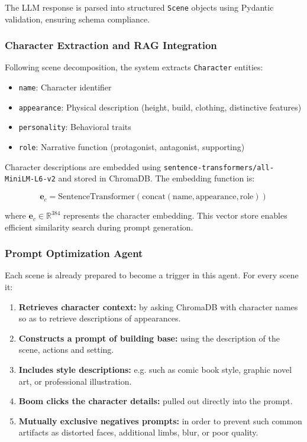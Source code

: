\documentclass[runningheads]{llncs}
\begin{document}
The LLM response is parsed into structured \texttt{Scene} objects using Pydantic validation, ensuring schema compliance.

\subsubsection{Character Extraction and RAG Integration}

Following scene decomposition, the system extracts \texttt{Character} entities:
\begin{itemize}
\item \texttt{name}: Character identifier
\item \texttt{appearance}: Physical description (height, build, clothing, distinctive features)
\item \texttt{personality}: Behavioral traits
\item \texttt{role}: Narrative function (protagonist, antagonist, supporting)
\end{itemize}

Character descriptions are embedded using \texttt{sentence-transformers/all-MiniLM-L6-v2} and stored in ChromaDB. The embedding function is:

\[
\mathbf{e}_c = \text{SentenceTransformer}(\text{concat}(\text{name}, \text{appearance}, \text{role}))
\]

where $\mathbf{e}_c \in \mathbb{R}^{384}$ represents the character embedding. This vector store enables efficient similarity search during prompt generation.

\subsubsection{Prompt Optimization Agent}

Each scene is already prepared to become a trigger in this agent. For every scene it:
\begin{enumerate}
\item \textbf{Retrieves character context:} by asking ChromaDB with character names so as to retrieve descriptions of appearances.
\item \textbf{Constructs a prompt of building base:} using the description of the scene, actions and setting.
\item \textbf{Includes style descriptions:} e.g. such as comic book style, graphic novel art, or professional illustration.
\item \textbf{Boom clicks the character details:} pulled out directly into the prompt.
\item \textbf{Mutually exclusive negatives prompts:} in order to prevent such common artifacts as distorted faces, additional limbs, blur, or poor quality.
\end{enumerate}
\end{document}
